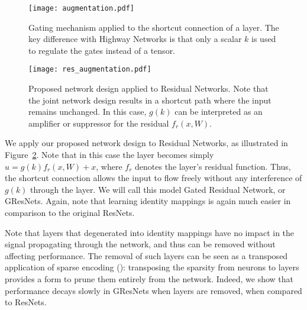 \documentclass{article} %
\begin{document}
\begin{figure}[!ht]
  \centering
    \texttt{[image: augmentation.pdf]}
  \caption{Gating mechanism applied to the shortcut connection of a layer. The key difference with Highway Networks is that only a scalar $k$ is used to regulate the gates instead of a tensor.}
\label{aug}
\end{figure}

\begin{figure}[!ht]
  \centering
    \texttt{[image: res\_augmentation.pdf]}
  \caption{Proposed network design applied to Residual Networks. Note that the joint network design results in a shortcut path where the input remains unchanged. In this case, $g(k)$ can be interpreted as an amplifier or suppressor for the residual $f_r(x,W)$.}
\label{resaug}
\end{figure}





We apply our proposed network design to Residual Networks, as illustrated in Figure~\ref{resaug}. Note that in this case the layer becomes simply $u = g(k) f_r(x,W) + x$, where $f_r$ denotes the layer's residual function. Thus, the shortcut connection allows the input to flow freely without any interference of $g(k)$ through the layer. We will call this model Gated Residual Network, or GResNets. Again, note that learning identity mappings is again much easier in comparison to the original ResNets. 




Note that layers that degenerated into identity mappings have no impact in the signal propagating through the network, and thus can be removed without affecting performance. The removal of such layers can be seen as a transposed application of sparse encoding (\cite{sparse}): transposing the sparsity from neurons to layers provides a form to prune them entirely from the network. Indeed, we show that performance decays slowly in GResNets when layers are removed, when compared to ResNets.
\end{document}
